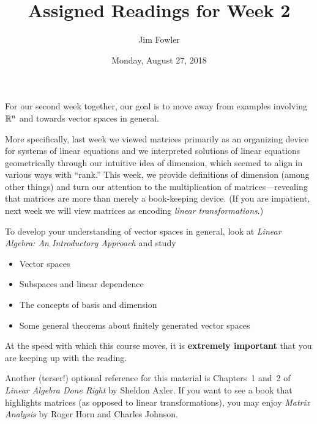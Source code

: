 \documentclass{homework}
\author{Jim Fowler}
\title{Assigned Readings for Week 2}
\date{Monday, August 27, 2018}
\begin{document}
\maketitle

For our second week together, our goal is to move away from examples
involving $\mathbb{R}^n$ and towards vector spaces in general.

More specifically, last week we viewed matrices primarily as an
organizing device for systems of linear equations and we interpreted
solutions of linear equations geometrically through our intuitive idea
of dimension, which seemed to align in various ways with ``rank.''
This week, we provide definitions of dimension (among other things)
and turn our attention to the multiplication of matrices---revealing
that matrices are more than merely a book-keeping device.  (If you are
impatient, next week we will view matrices as encoding \textit{linear
  transformations}.)

To develop your understanding of vector spaces in general, look at
\textit{Linear Algebra: An Introductory Approach} and study
\begin{itemize}
\item {} Vector spaces
\item {} Subspaces and linear dependence
\item {} The concepts of basis and dimension
\item {} Some general theorems about finitely generated vector spaces
\end{itemize}
At the speed with which this course moves, it is \textbf{extremely
  important} that you are keeping up with the reading.

Another (terser!) optional reference for this material is Chapters~1
and~2 of \textit{Linear Algebra Done Right} by Sheldon Axler.  If you
want to see a book that highlights matrices (as opposed to linear
transformations), you may enjoy \textit{Matrix Analysis} by Roger Horn
and Charles Johnson.
\end{document}
